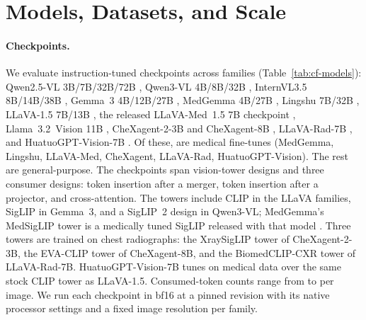 \section{Models, Datasets, and Scale}
\label{sec:setup}

\paragraph{Checkpoints.}
We evaluate \cfCheckpoints{} instruction-tuned checkpoints across \cfFamiliesWord{} families (Table~\ref{tab:cf-models}): Qwen2.5-VL 3B/7B/32B/72B \citep{bai2025qwen25vl}, Qwen3-VL 4B/8B/32B \citep{qwen2025qwen3vl}, InternVL3.5 8B/14B/38B \citep{wang2025internvl35}, Gemma~3 4B/12B/27B \citep{gemma2025gemma3}, MedGemma 4B/27B \citep{sellergren2025medgemma}, Lingshu 7B/32B \citep{lasa2025lingshu}, LLaVA-1.5 7B/13B \citep{liu2024improved}, the released LLaVA-Med~1.5 7B checkpoint \citep{li2023llavamed}, Llama~3.2~Vision 11B \citep{meta2024llama32vision}, CheXagent-2-3B and CheXagent-8B \citep{chen2024chexagent}, LLaVA-Rad-7B \citep{zambranochaves2025llavarad}, and HuatuoGPT-Vision-7B \citep{chen2024huatuogptvision}. Of these, \cfMedicalFamiliesWord{} are medical fine-tunes (MedGemma, Lingshu, LLaVA-Med, CheXagent, LLaVA-Rad, HuatuoGPT-Vision). The rest are general-purpose. The checkpoints span \cfTowerDesignsWord{} vision-tower designs and three consumer designs: token insertion after a merger, token insertion after a projector, and cross-attention. The towers include CLIP \citep{radford2021clip} in the LLaVA families, SigLIP \citep{zhai2023siglip} in Gemma~3, and a SigLIP~2 design \citep{tschannen2025siglip2} in Qwen3-VL; MedGemma's MedSigLIP tower is a medically tuned SigLIP released with that model \citep{sellergren2025medgemma}. Three towers are trained on chest radiographs: the XraySigLIP tower of CheXagent-2-3B, the EVA-CLIP tower of CheXagent-8B, and the BiomedCLIP-CXR tower of LLaVA-Rad-7B. HuatuoGPT-Vision-7B tunes on medical data over the same stock CLIP tower as LLaVA-1.5. Consumed-token counts range from \cfTokensMin{} to \cfTokensMax{} per image. We run each checkpoint in bf16 at a pinned revision with its native processor settings and a fixed image resolution per family.

